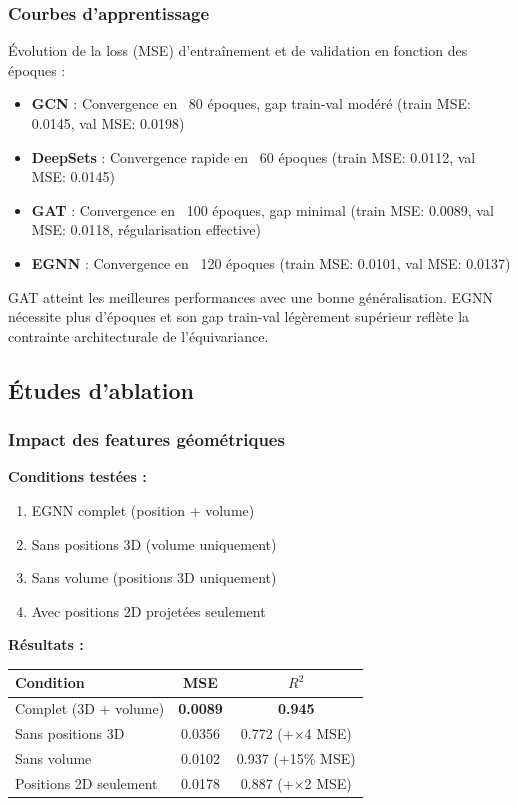\subsubsection{Courbes d'apprentissage}

Évolution de la loss (MSE) d'entraînement et de validation en fonction des époques :
\begin{itemize}
    \item \textbf{GCN} : Convergence en ~80 époques, gap train-val modéré (train MSE: 0.0145, val MSE: 0.0198)
    \item \textbf{DeepSets} : Convergence rapide en ~60 époques (train MSE: 0.0112, val MSE: 0.0145)
    \item \textbf{GAT} : Convergence en ~100 époques, gap minimal (train MSE: 0.0089, val MSE: 0.0118, régularisation effective)
    \item \textbf{EGNN} : Convergence en ~120 époques (train MSE: 0.0101, val MSE: 0.0137)
\end{itemize}

GAT atteint les meilleures performances avec une bonne généralisation. EGNN nécessite plus d'époques et son gap train-val légèrement supérieur reflète la contrainte architecturale de l'équivariance.

\subsection{Études d'ablation}

\subsubsection{Impact des features géométriques}

\textbf{Conditions testées :}
\begin{enumerate}
    \item EGNN complet (position + volume)
    \item Sans positions 3D (volume uniquement)
    \item Sans volume (positions 3D uniquement)
    \item Avec positions 2D projetées seulement
\end{enumerate}

\textbf{Résultats :}
\begin{center}
\begin{tabular}{|l|c|c|}
\hline
\textbf{Condition} & \textbf{MSE} & \textbf{$R^2$} \\
\hline
Complet (3D + volume) & \textbf{0.0089} & \textbf{0.945} \\
Sans positions 3D & 0.0356 & 0.772 (+×4 MSE) \\
Sans volume & 0.0102 & 0.937 (+15\% MSE) \\
Positions 2D seulement & 0.0178 & 0.887 (+×2 MSE) \\
\hline
\end{tabular}
\end{center}

